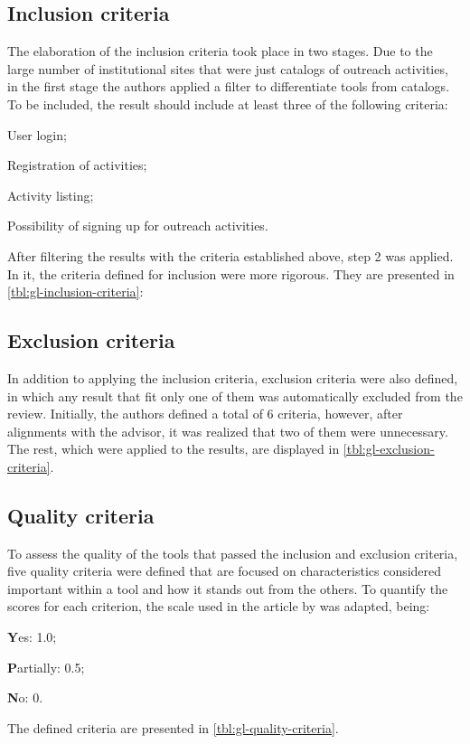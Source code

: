 \subsection{Inclusion criteria}\label{sec:gl-planning-inc}

The elaboration of the inclusion criteria took place in two stages. Due to the large number of institutional sites that were just catalogs of outreach activities, in the first stage the authors applied a filter to differentiate tools from catalogs. To be included, the result should include at least three of the following criteria:
\begin{inparaenum}[(a)]
  \item User login;
  \item Registration of activities;
  \item Activity listing;
  \item Possibility of signing up for outreach activities.
\end{inparaenum}

After filtering the results with the criteria established above, step 2 was applied. In it, the criteria defined for inclusion were more rigorous. They are presented in \autoref{tbl:gl-inclusion-criteria}:



\subsection{Exclusion criteria}\label{sec:gl-planning-exc}

In addition to applying the inclusion criteria, exclusion criteria were also defined, in which any result that fit only one of them was automatically excluded from the review. Initially, the authors defined a total of 6 criteria, however, after alignments with the advisor, it was realized that two of them were unnecessary. The rest, which were applied to the results, are displayed in \autoref{tbl:gl-exclusion-criteria}.



\subsection{Quality criteria}\label{sec:gl-planning-qlty}

To assess the quality of the tools that passed the inclusion and exclusion criteria, five quality criteria were defined that are focused on characteristics considered important within a tool and how it stands out from the others. To quantify the scores for each criterion, the scale used in the article by \cite{iung2020systematic} was adapted, being:
\begin{inparaenum}[(i)]
  \item \textbf{Y}es: 1.0;
  \item \textbf{P}artially: 0.5;
  \item \textbf{N}o: 0.
\end{inparaenum}
The defined criteria are presented in \autoref{tbl:gl-quality-criteria}.

